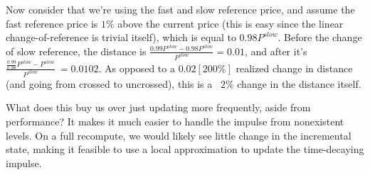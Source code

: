 \documentclass[]{article}
\begin{document}
	Now consider that we're using the fast and slow reference price, and assume the fast reference price is $1\%$ above the current price (this is easy since the linear change-of-reference is trivial itself), which is equal to $0.98P^{slow}$. Before the change of slow reference, the distance is $\frac{0.99P^{slow} - 0.98P^{slow}}{P^{slow}} = 0.01$, and after it's $\frac{\frac{0.99}{0.98}P^{slow} - P^{slow}}{P^{slow}} ~= 0.0102$. As opposed to a $0.02 [200\%]$ realized change in distance (and going from crossed to uncrossed), this is a ~$2\%$ change in the distance itself.
	
	What does this buy us over just updating more frequently, aside from performance? It makes it much easier to handle the impulse from nonexistent levels. On a full recompute, we would likely see little change in the incremental state, making it feasible to use a local approximation to update the time-decaying impulse.
	
\end{document}
